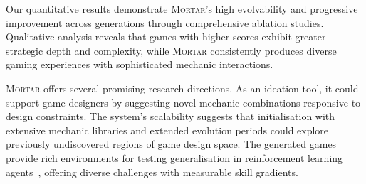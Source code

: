 \documentclass{article} %
\newcommand{\name}{\textsc{Mortar}}
\begin{document}
Our quantitative results demonstrate \name{}'s high evolvability and progressive improvement across generations through comprehensive ablation studies. Qualitative analysis reveals that games with higher scores exhibit greater strategic depth and complexity, while \name{} consistently produces diverse gaming experiences with sophisticated mechanic interactions.

\name{} offers several promising research directions. As an ideation tool, it could support game designers by suggesting novel mechanic combinations responsive to design constraints. The system's scalability suggests that initialisation with extensive mechanic libraries and extended evolution periods could explore previously undiscovered regions of game design space. The generated games provide rich environments for testing generalisation in reinforcement learning agents~\citep{sutton1999reinforcement}, offering diverse challenges with measurable skill gradients. 



\end{document}
